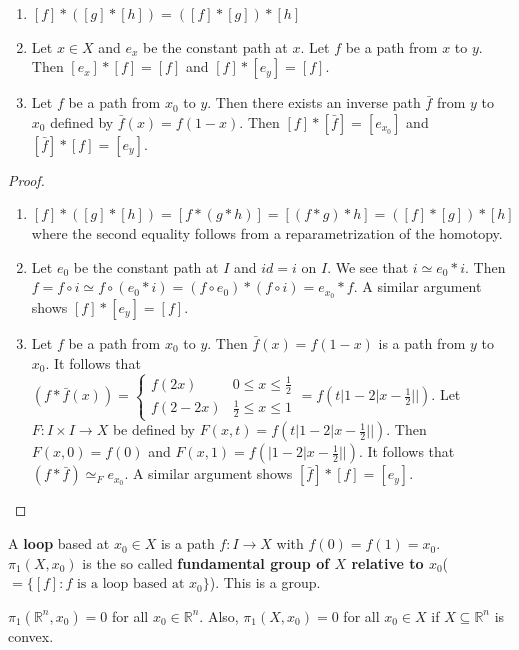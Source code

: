 \begin{theorem}\label{2.6} 
    \leavevmode
    \begin{enumerate}
        \item $[f]*([g]*[h])=([f]*[g])*[h]$
        \item Let $x\in X$ and $e_x$ be the constant path at $x$. Let $f$ be a path from $x$ to $y$. Then $[e_x]*[f]=[f]$ and $[f]*[e_y]=[f]$.
        \item Let $f$ be a path from $x_0$ to $y$. Then there exists an inverse path $\bar f$ from $y$ to $x_0$ defined by $\bar f(x)=f(1-x)$. Then $[f]*[\bar f]=[e_{x_0}]$ and $[\bar f]*[f]=[e_y]$.   
    \end{enumerate}
\end{theorem}
\begin{proof}
    \begin{enumerate}
        \item $[f]*([g]*[h])=[f*(g*h)]=[(f*g)*h]=([f]*[g])*[h]$ where the second equality follows from a reparametrization of the homotopy.
        \item Let $e_0$ be the constant path at $I$ and $id=i$ on $I$. We see that $i\simeq e_0* i$. Then $f=f\circ i\simeq f\circ (e_0*i)=(f\circ e_0)*(f\circ i)=e_{x_0}*f$. A similar argument shows $[f]*[e_y]=[f]$.
        \item Let $f$ be a path from $x_0$ to $y$. Then $\bar f(x)=f(1-x)$ is a path from $y$ to $x_0$. It follows that $(f*\bar f(x))=\begin{cases}
            f(2x) & 0\leq x\leq \frac{1}{2}\\
            f(2-2x) & \frac{1}{2}\leq x\leq 1
            \end{cases}=f(t|1-2|x-\frac{1}{2}||)$. Let $F:I\times I\to X$ be defined by $F(x,t)=f(t|1-2|x-\frac{1}{2}||)$. Then $F(x,0)=f(0)$ and $F(x,1)=f(|1-2|x-\frac{1}{2}||)$. It follows that $(f*\bar f)\simeq_F e_{x_0}$. A similar argument shows $[\bar f]*[f]=[e_y]$.
    \end{enumerate}
\end{proof}
\begin{definition}\label{2.7}
    A \textbf{loop} based at $x_0\in X$ is a path $f:I\to X$ with $f(0)=f(1)=x_0$.\\
    $\pi_1(X,x_0)$ is the so called \textbf{fundamental group of $X$ relative to $x_0$}($=\{[f]:f\text{ is a loop based at }x_0\}$). This is a group. 
\end{definition}
\begin{example}
    $\pi_1(\mathbb{R}^n,x_0)=0$ for all $x_0\in \mathbb{R}^n$. Also, $\pi_1(X,x_0)=0$ for all $x_0\in X$ if $X\subseteq \mathbb{R}^n$ is convex. 
\end{example}

